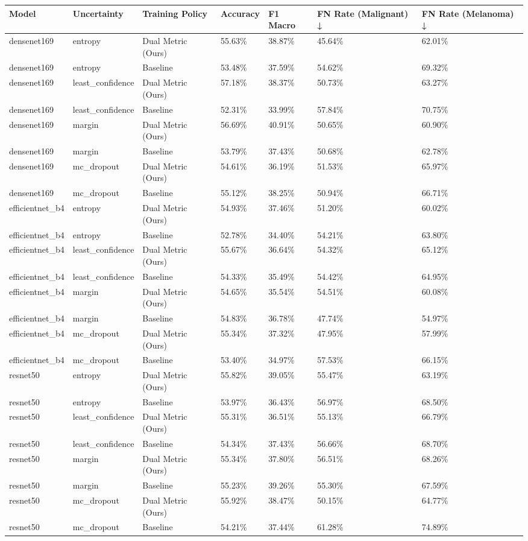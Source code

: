 \begin{tabular}{lllllll}
\toprule
Model & Uncertainty & Training Policy & Accuracy & F1 Macro & FN Rate (Malignant) ↓ & FN Rate (Melanoma) ↓ \\
\midrule
densenet169 & entropy & Dual Metric (Ours) & 55.63\% & 38.87\% & 45.64\% & 62.01\% \\
densenet169 & entropy & Baseline & 53.48\% & 37.59\% & 54.62\% & 69.32\% \\
densenet169 & least\_confidence & Dual Metric (Ours) & 57.18\% & 38.37\% & 50.73\% & 63.27\% \\
densenet169 & least\_confidence & Baseline & 52.31\% & 33.99\% & 57.84\% & 70.75\% \\
densenet169 & margin & Dual Metric (Ours) & 56.69\% & 40.91\% & 50.65\% & 60.90\% \\
densenet169 & margin & Baseline & 53.79\% & 37.43\% & 50.68\% & 62.78\% \\
densenet169 & mc\_dropout & Dual Metric (Ours) & 54.61\% & 36.19\% & 51.53\% & 65.97\% \\
densenet169 & mc\_dropout & Baseline & 55.12\% & 38.25\% & 50.94\% & 66.71\% \\
efficientnet\_b4 & entropy & Dual Metric (Ours) & 54.93\% & 37.46\% & 51.20\% & 60.02\% \\
efficientnet\_b4 & entropy & Baseline & 52.78\% & 34.40\% & 54.21\% & 63.80\% \\
efficientnet\_b4 & least\_confidence & Dual Metric (Ours) & 55.67\% & 36.64\% & 54.32\% & 65.12\% \\
efficientnet\_b4 & least\_confidence & Baseline & 54.33\% & 35.49\% & 54.42\% & 64.95\% \\
efficientnet\_b4 & margin & Dual Metric (Ours) & 54.65\% & 35.54\% & 54.51\% & 60.08\% \\
efficientnet\_b4 & margin & Baseline & 54.83\% & 36.78\% & 47.74\% & 54.97\% \\
efficientnet\_b4 & mc\_dropout & Dual Metric (Ours) & 55.34\% & 37.32\% & 47.95\% & 57.99\% \\
efficientnet\_b4 & mc\_dropout & Baseline & 53.40\% & 34.97\% & 57.53\% & 66.15\% \\
resnet50 & entropy & Dual Metric (Ours) & 55.82\% & 39.05\% & 55.47\% & 63.19\% \\
resnet50 & entropy & Baseline & 53.97\% & 36.43\% & 56.97\% & 68.50\% \\
resnet50 & least\_confidence & Dual Metric (Ours) & 55.31\% & 36.51\% & 55.13\% & 66.79\% \\
resnet50 & least\_confidence & Baseline & 54.34\% & 37.43\% & 56.66\% & 68.70\% \\
resnet50 & margin & Dual Metric (Ours) & 55.34\% & 37.80\% & 56.51\% & 68.26\% \\
resnet50 & margin & Baseline & 55.23\% & 39.26\% & 55.30\% & 67.59\% \\
resnet50 & mc\_dropout & Dual Metric (Ours) & 55.92\% & 38.47\% & 50.15\% & 64.77\% \\
resnet50 & mc\_dropout & Baseline & 54.21\% & 37.44\% & 61.28\% & 74.89\% \\
\bottomrule
\end{tabular}
